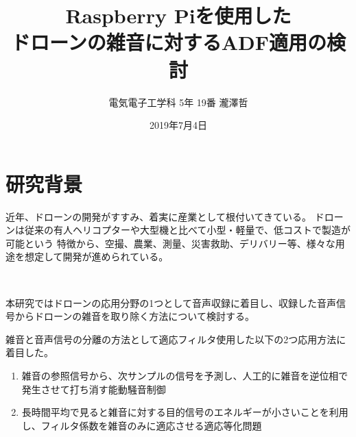 \documentclass[a4paper, twocolumn]{ltjsarticle}
\title{Raspberry Piを使用した\\ドローンの雑音に対するADF適用の検討}
\author{電気電子工学科 5年 19番 瀧澤哲}
\date{2019年7月4日}
\begin{document}
%

\maketitle
  
\section{研究背景}

  近年、ドローンの開発がすすみ、着実に産業として根付いてきている。%
  ドローンは従来の有人ヘリコプターや大型機と比べて小型・軽量で、低コストで製造が可能という%
  特徴から、空撮、農業、測量、災害救助、デリバリー等、様々な用途を想定して開発が進められている。

  

  本研究ではドローンの応用分野の1つとして音声収録に着目し、収録した音声信号からドローンの雑音を取り除く方法について検討する。




  
  雑音と音声信号の分離の方法として適応フィルタ使用した以下の2つ応用方法に着目した。
\begin{enumerate}
  \renewcommand{\labelenumi}{(\arabic{enumi})}
  \item 雑音の参照信号から、次サンプルの信号を予測し、人工的に雑音を逆位相で発生させて打ち消す能動騒音制御
  \item 長時間平均で見ると雑音に対する目的信号のエネルギーが小さいことを利用し、フィルタ係数を雑音のみに適応させる適応等化問題
\end{enumerate}  
\end{document}
